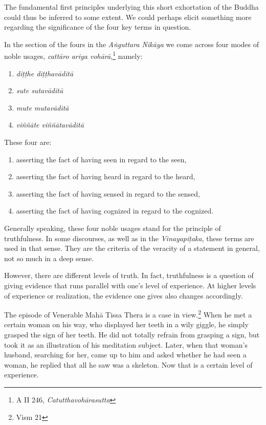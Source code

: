 The fundamental first principles underlying this short exhortation of the Buddha could thus be inferred to some extent. We could perhaps elicit something more regarding the significance of the four key terms in question.

In the section of the fours in the \emph{Aṅguttara Nikāya} we come across four modes of noble usages, \emph{cattāro ariya vohārā},\footnote{A II 246, \emph{Catutthavohārasutta}} namely:

\begin{enumerate}
\def\labelenumi{\arabic{enumi}.}
\tightlist
\item
  \emph{diṭṭhe diṭṭhavāditā}
\item
  \emph{sute sutavāditā}
\item
  \emph{mute mutavāditā}
\item
  \emph{viññāte viññātavāditā}
\end{enumerate}

These four are:

\begin{enumerate}
\def\labelenumi{\arabic{enumi}.}
\tightlist
\item
  asserting the fact of having seen in regard to the seen,
\item
  asserting the fact of having heard in regard to the heard,
\item
  asserting the fact of having sensed in regard to the sensed,
\item
  asserting the fact of having cognized in regard to the cognized.
\end{enumerate}

Generally speaking, these four noble usages stand for the principle of truthfulness. In some discourses, as well as in the \emph{Vinayapiṭaka}, these terms are used in that sense. They are the criteria of the veracity of a statement in general, not so much in a deep sense.

However, there are different levels of truth. In fact, truthfulness is a question of giving evidence that runs parallel with one's level of experience. At higher levels of experience or realization, the evidence one gives also changes accordingly.

The episode of Venerable Mahā Tissa Thera is a case in view.\footnote{Vism 21} When he met a certain woman on his way, who displayed her teeth in a wily giggle, he simply grasped the sign of her teeth. He did not totally refrain from grasping a sign, but took it as an illustration of his meditation subject. Later, when that woman's husband, searching for her, came up to him and asked whether he had seen a woman, he replied that all he saw was a skeleton. Now that is a certain level of experience.

